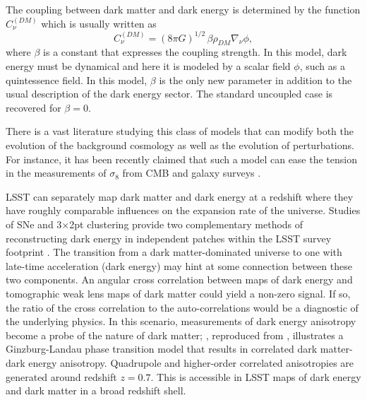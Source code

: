 The coupling between dark matter and dark energy is determined by the function $C^{(DM)}_{\nu}$ which is usually
written as
\begin{equation}
C^{(DM)}_{\nu} = (8\pi G)^{1/2} \,\beta\rho_{DM}\nabla_{\nu} \phi,
\end{equation}
where $\beta$ is a constant that expresses the coupling strength. In this model, dark energy must be dynamical and here it is modeled by a scalar field  $\phi$, such as a quintessence field.
In this model, $\beta$ is the only new parameter in addition to the usual description of the dark energy sector.
The standard uncoupled case is recovered for $\beta=0$.

There is a vast literature studying this class of models that can modify both the evolution of the 
background cosmology as well as the evolution of perturbations. For instance, it has been recently claimed
that such a model can ease the tension in the measurements of $\sigma_8$ from CMB and galaxy surveys 
\citep{Barros:2018efl}.

LSST can separately map dark matter and dark energy at a redshift where they have roughly comparable influences on the expansion rate of the universe. 
Studies of SNe and 3$\times$2pt clustering provide two complementary methods of reconstructing dark energy in independent patches within the LSST survey footprint \citep[\eg][]{0902.2590}.
The transition from a dark matter-dominated universe to one with late-time acceleration (dark energy) may hint at some connection between these two components. 
An angular cross correlation between maps of dark energy and tomographic weak lens maps of dark matter could yield a non-zero signal.  
If so, the ratio of the cross correlation to the auto-correlations would be a diagnostic of the underlying physics. 
In this scenario, measurements of dark energy anisotropy become a probe of the nature of dark matter; , reproduced from \cite{1810.11007}, illustrates a Ginzburg-Landau phase transition model that results in correlated dark matter-dark energy anisotropy. 
Quadrupole and higher-order correlated anisotropies are generated around redshift $z=0.7$.  
This is accessible in LSST maps of dark energy and dark matter in a broad redshift shell.

